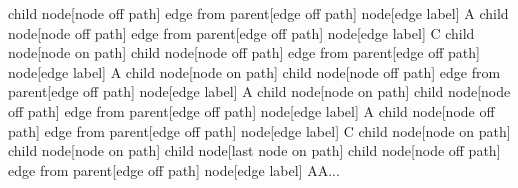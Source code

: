   child {
  node[node off path] {}
  edge from parent[edge off path] node[edge label] {A}
  }
  child {
  node[node off path] {}
  edge from parent[edge off path] node[edge label] {C}
  }
  child {
  node[node on path] {}
    child {
    node[node off path] {}
    edge from parent[edge off path] node[edge label] {A}
    }
    child {
    node[node on path] {}
      child {
      node[node off path] {}
      edge from parent[edge off path] node[edge label] {A}
      }
      child {
      node[node on path] {}
        child {
        node[node off path] {}
        edge from parent[edge off path] node[edge label] {A}
        }
        child {
        node[node off path] {}
        edge from parent[edge off path] node[edge label] {C}
        }
        child {
        node[node on path] {}
          child {
          node[node on path] {}
            child {
            node[last node on path] {}
                                                                                                                                                                                                                                                                                                                                                                                                                                                                                                child {
                                                                                                                                                                                                                                                                                                                                                                                                                                                                                                node[node off path] {}
                                                                                                                                                                                                                                                                                                                                                                                                                                                                                                edge from parent[edge off path] node[edge label] {AA...}
                                                                                                                                                                                                                                                                                                                                                                                                                                                                                                }
}}}}}}
